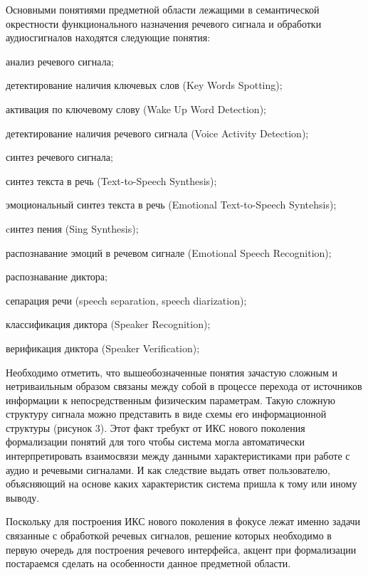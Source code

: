 Основными понятиями предметной области лежащими в семантической окрестности функционального назначения речевого сигнала  и обработки аудиосгигналов находятся следующие понятия:
\begin{textitemize}    
    \item анализ речевого сигнала;
    \item детектирование наличия ключевых слов (Key Words Spotting);
    \item активация по ключевому слову (Wake Up Word Detection);
    \item детектирование наличия речевого сигнала (Voice Activity Detection);
    \item синтез речевого сигнала;
    \item синтез текста в речь (Text-to-Speech Synthesis);
    \item эмоциональный синтез текста в речь (Emotional Text-to-Speech Syntehsis);
    \item cинтез пения (Sing Synthesis);
    \item распознавание эмоций в речевом сигнале (Emotional Speech Recognition);
    \item распознавание диктора;
    \item сепарация речи (speech separation, speech diarization);
    \item классификация диктора (Speaker Recognition);
    \item верификация диктора (Speaker Verification);
\end{textitemize}

Необходимо отметить, что вышеобозначенные понятия зачастую сложным и нетриваильным образом связаны между собой в процессе перехода от источников информации к непосредственным физическим параметрам. Такую сложную структуру сигнала можно представить в виде схемы его информационной структуры (рисунок 3). Этот факт требукт от ИКС нового поколения формализации понятий для того чтобы система могла автоматически интерпретировать взаимосвязи между данными характеристиками при работе с аудио и речевыми сигналами. И как следствие выдать ответ пользователю, объясняющий на основе каких характеристик система пришла к тому или иному выводу. 

Поскольку для построения ИКС нового поколения в фокусе лежат именно задачи связанные с обработкой речевых сигналов, решение которых необходимо в первую очередь для построения речевого интерфейса, акцент при формализации постараемся сделать на особенности данное предметной области.

